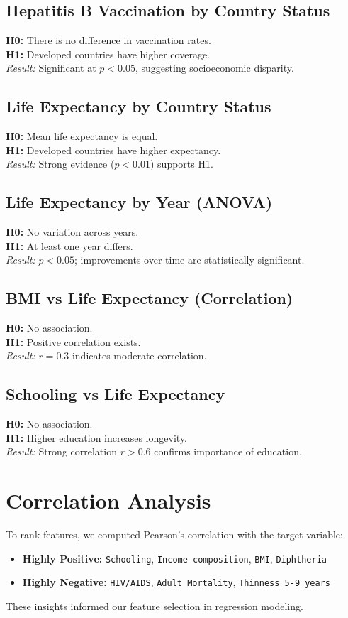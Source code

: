 \documentclass[11pt]{article}
\begin{document}
\subsection{Hepatitis B Vaccination by Country Status}
\textbf{H0:} There is no difference in vaccination rates. \\
\textbf{H1:} Developed countries have higher coverage. \\
\textit{Result:} Significant at $p < 0.05$, suggesting socioeconomic disparity.

\subsection{Life Expectancy by Country Status}
\textbf{H0:} Mean life expectancy is equal. \\
\textbf{H1:} Developed countries have higher expectancy. \\
\textit{Result:} Strong evidence ($p < 0.01$) supports H1.

\subsection{Life Expectancy by Year (ANOVA)}
\textbf{H0:} No variation across years. \\
\textbf{H1:} At least one year differs. \\
\textit{Result:} $p < 0.05$; improvements over time are statistically significant.

\subsection{BMI vs Life Expectancy (Correlation)}
\textbf{H0:} No association. \\
\textbf{H1:} Positive correlation exists. \\
\textit{Result:} $r = 0.3$ indicates moderate correlation.

\subsection{Schooling vs Life Expectancy}
\textbf{H0:} No association. \\
\textbf{H1:} Higher education increases longevity. \\
\textit{Result:} Strong correlation $r > 0.6$ confirms importance of education.

\section{Correlation Analysis}
To rank features, we computed Pearson's correlation with the target variable:
\begin{itemize}
    \item \textbf{Highly Positive:} \texttt{Schooling}, \texttt{Income composition}, \texttt{BMI}, \texttt{Diphtheria}
    \item \textbf{Highly Negative:} \texttt{HIV/AIDS}, \texttt{Adult Mortality}, \texttt{Thinness 5-9 years}
\end{itemize}
These insights informed our feature selection in regression modeling.
\end{document}
